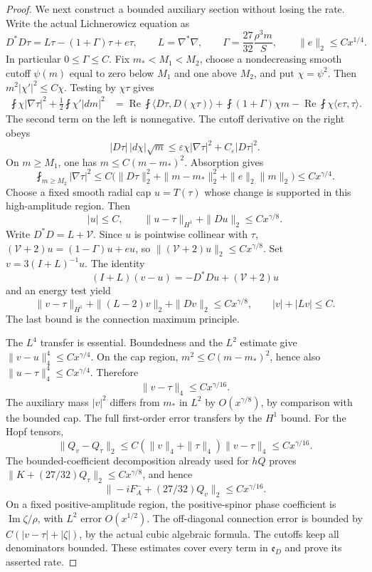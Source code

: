 \begin{proof}
We next construct a bounded auxiliary section without losing the
rate. Write the actual Lichnerowicz equation as
\[
 D^*D\tau=L\tau-(1+\Gamma)\tau+e\tau,
 \qquad L=\nabla^*\nabla,\qquad
 \Gamma=\frac{27}{32}\frac{\rho^3m}{S},
 \qquad \|e\|_2\le Cx^{1/4}.
\]
In particular $0\le\Gamma\le C$. Fix $m_*<M_1<M_2$, choose a
nondecreasing smooth cutoff $\psi(m)$ equal to zero below $M_1$
and one above $M_2$, and put $\chi=\psi^2$. Then
$m^2|\chi'|^2\le C\chi$. Testing by $\chi\tau$ gives
\begin{align*}
 \fint\chi|\nabla\tau|^2+\tfrac12\fint\chi'|dm|^2
 &=\operatorname{Re}\fint\langle D\tau,D(\chi\tau)\rangle
   +\fint(1+\Gamma)\chi m
   -\operatorname{Re}\fint\chi\langle e\tau,\tau\rangle.
\end{align*}
The second term on the left is nonnegative. The cutoff derivative on
the right obeys
\[
 |D\tau|\,|d\chi|\sqrt m
 \le\varepsilon\chi|\nabla\tau|^2+C_\varepsilon|D\tau|^2.
\]
On $m\ge M_1$, one has $m\le C(m-m_*)^2$. Absorption gives
\begin{equation}\label{eq:web-tail-gradient-rate}
 \fint_{m\ge M_2}|\nabla\tau|^2
 \le C\bigl(\|D\tau\|_2^2+\|m-m_*\|_2^2+
                 \|e\|_2\|m\|_2\bigr)
 \le Cx^{\gamma/4}.
\end{equation}
Choose a fixed smooth radial cap $u=T(\tau)$ whose change is supported
in this high-amplitude region. Then
\[
 |u|\le C,\qquad \|u-\tau\|_{H^1}+\|Du\|_2\le Cx^{\gamma/8}.
\]
Write $D^*D=L+\mathcal V$. Since $u$ is pointwise collinear with
$\tau$, $(\mathcal V+2)u=(1-\Gamma)u+eu$, so
$\|(\mathcal V+2)u\|_2\le Cx^{\gamma/8}$. Set
$v=3(I+L)^{-1}u$. The identity
\[
 (I+L)(v-u)=-D^*Du+(\mathcal V+2)u
\]
and an energy test yield
\begin{equation}\label{eq:web-resolvent-rate}
 \|v-\tau\|_{H^1}+\|(L-2)v\|_2+\|Dv\|_2
 \le Cx^{\gamma/8},\qquad |v|+|Lv|\le C.
\end{equation}
The last bound is the connection maximum principle.

The $L^4$ transfer is essential. Boundedness and the $L^2$ estimate
give $\|v-u\|_4^4\le Cx^{\gamma/4}$. On the cap region,
$m^2\le C(m-m_*)^2$, hence also
$\|u-\tau\|_4^4\le Cx^{\gamma/4}$. Therefore
\begin{equation}\label{eq:web-fourth-norm-transfer}
 \|v-\tau\|_4\le Cx^{\gamma/16}.
\end{equation}
The auxiliary mass $|v|^2$ differs from $m_*$ in $L^2$ by
$O(x^{\gamma/8})$, by comparison with the bounded cap. The full
first-order error transfers by the $H^1$ bound. For the Hopf tensors,
\[
 \|Q_v-Q_\tau\|_2
 \le C(\|v\|_4+\|\tau\|_4)\|v-\tau\|_4
 \le Cx^{\gamma/16}.
\]
The bounded-coefficient decomposition already used for $hQ$ proves
$\|K+(27/32)Q_\tau\|_2\le Cx^{\gamma/8}$, and hence
\[
 \|-iF_A^-+(27/32)Q_v\|_2\le Cx^{\gamma/16}.
\]
On a fixed positive-amplitude region, the positive-spinor phase
coefficient is $\operatorname{Im}\zeta/\rho$, with $L^2$ error
$O(x^{1/2})$. The off-diagonal connection error is bounded by
$C(|v-\tau|+|\zeta|)$, by the actual cubic algebraic formula.
The cutoffs keep all denominators bounded. These estimates cover
every term in $\mathfrak e_D$ and prove its asserted rate.


\end{proof}
